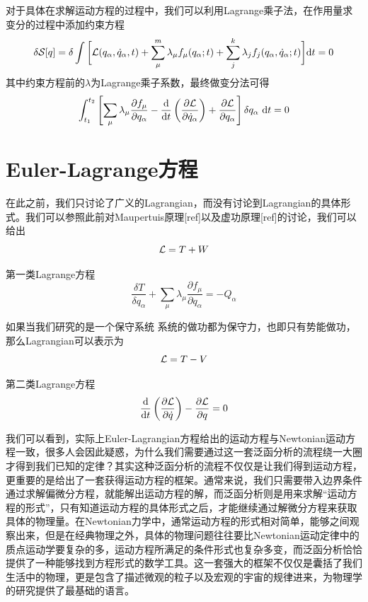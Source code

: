 对于具体在求解运动方程的过程中，我们可以利用Lagrange乘子法，在作用量求变分的过程中添加约束方程
\begin{equation}
    \delta \mathcal{S}[q] = \delta\int \bigg[ \mathcal{L}(q_\alpha,\dot q_\alpha,t) + \sum_\mu^m \lambda_\mu f_\mu(q_\alpha;t) + \sum_j^k \lambda_j  f_j(q_\alpha,\dot q_\alpha;t) \bigg]\mathrm{d} t = 0
\end{equation}
其中约束方程前的$\lambda$为Lagrange乘子系数，最终做变分法可得
\begin{equation}
     \int_{t_1}^{t_2}\left[\sum_\mu\lambda_\mu\frac{\partial f_\mu}{\partial q_\alpha}- \frac{\mathrm{d} }{\mathrm{d} t} \left(\frac{\partial\mathcal{L}}{\partial \dot{q}_\alpha} \right) +\frac{\partial\mathcal{L}}{\partial q_\alpha}  \right] \delta q_\alpha~\mathrm{d} t=0
\end{equation}

\section{Euler-Lagrange方程}
\label{sec:eom}
在此之前，我们只讨论了广义的Lagrangian，而没有讨论到Lagrangian的具体形式。我们可以参照此前对Maupertuis原理[ref]以及虚功原理[ref]的讨论，我们可以给出
\begin{equation}
    \mathcal{L} = T+W
\end{equation}


第一类Lagrange方程\cite{Lagrange1788a}
\begin{equation}
    \frac{\delta T}{\delta q_\alpha} + \sum_\mu \lambda_\mu \frac{\partial f_\mu}{\partial q_\alpha}=-Q_\alpha
\end{equation}


如果当我们研究的是一个保守系统
系统的做功都为保守力，也即只有势能做功，那么Lagrangian可以表示为
\begin{equation}
    \mathcal{L} = T - V
\end{equation}

第二类Lagrange方程
\begin{equation}
    \frac{\mathrm{d}}{\mathrm{d} t} \left(\frac{\partial\mathcal{L}}{\partial \dot{q}} \right)-\frac{\partial\mathcal{L}}{\partial q}  = 0\label{eq:eqomot}
\end{equation}

我们可以看到，实际上Euler-Lagrangian方程给出的运动方程与Newtonian运动方程一致，很多人会因此疑惑，为什么我们需要通过这一套泛函分析的流程绕一大圈才得到我们已知的定律？其实这种泛函分析的流程不仅仅是让我们得到运动方程，更重要的是给出了一套获得运动方程的框架。通常来说，我们只需要带入边界条件通过求解偏微分方程，就能解出运动方程的解，而泛函分析则是用来求解“运动方程的形式”，只有知道运动方程的具体形式之后，才能继续通过解微分方程来获取具体的物理量。在Newtonian力学中，通常运动方程的形式相对简单，能够之间观察出来，但是在经典物理之外，具体的物理问题往往要比Newtonian运动定律中的质点运动学要复杂的多，运动方程所满足的条件形式也复杂多变，而泛函分析恰恰提供了一种能够找到方程形式的数学工具。这一套强大的框架不仅仅是囊括了我们生活中的物理，更是包含了描述微观的粒子以及宏观的宇宙的规律进来，为物理学的研究提供了最基础的语言。

